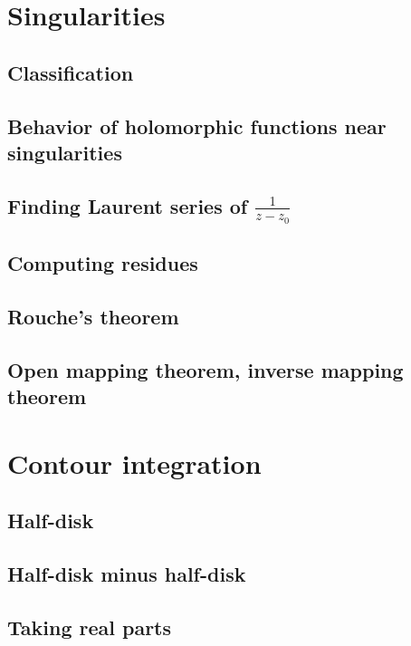 \section{Singularities}

\subsection{Classification}

\subsection{Behavior of holomorphic functions near singularities}

\subsection{Finding Laurent series of $\frac{1}{z - z_0}$}

\subsection{Computing residues}

\subsection{Rouche's theorem}

\subsection{Open mapping theorem, inverse mapping theorem}



\section{Contour integration}

\subsection{Half-disk}

\subsection{Half-disk minus half-disk}

\subsection{Taking real parts}

